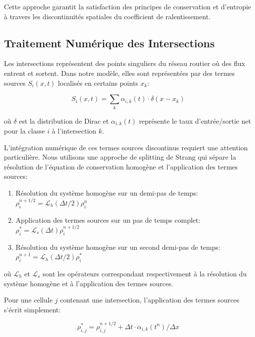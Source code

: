 Cette approche garantit la satisfaction des principes de conservation et d'entropie à travers les discontinuités spatiales du coefficient de ralentissement.

\subsection{Traitement Numérique des Intersections}
\label{subsec:traitement_intersections}

Les intersections représentent des points singuliers du réseau routier où des flux entrent et sortent. Dans notre modèle, elles sont représentées par des termes sources $S_i(x,t)$ localisés en certains points $x_k$:

\begin{equation}
S_i(x,t) = \sum_k \alpha_{i,k}(t) \cdot \delta(x-x_k)
\end{equation}

où $\delta$ est la distribution de Dirac et $\alpha_{i,k}(t)$ représente le taux d'entrée/sortie net pour la classe $i$ à l'intersection $k$.

L'intégration numérique de ces termes sources discontinus requiert une attention particulière. Nous utilisons une approche de splitting de Strang qui sépare la résolution de l'équation de conservation homogène et l'application des termes sources:

\begin{enumerate}
\item Résolution du système homogène sur un demi-pas de temps: $\rho_i^{n+1/2} = \mathcal{L}_h(\Delta t/2) \rho_i^n$
\item Application des termes sources sur un pas de temps complet: $\rho_i^{*} = \mathcal{L}_s(\Delta t) \rho_i^{n+1/2}$
\item Résolution du système homogène sur un second demi-pas de temps: $\rho_i^{n+1} = \mathcal{L}_h(\Delta t/2) \rho_i^{*}$
\end{enumerate}

où $\mathcal{L}_h$ et $\mathcal{L}_s$ sont les opérateurs correspondant respectivement à la résolution du système homogène et à l'application des termes sources.

Pour une cellule $j$ contenant une intersection, l'application des termes sources s'écrit simplement:

\begin{equation}
\rho_{i,j}^{*} = \rho_{i,j}^{n+1/2} + \Delta t \cdot \alpha_{i,k}(t^n) / \Delta x
\end{equation}

